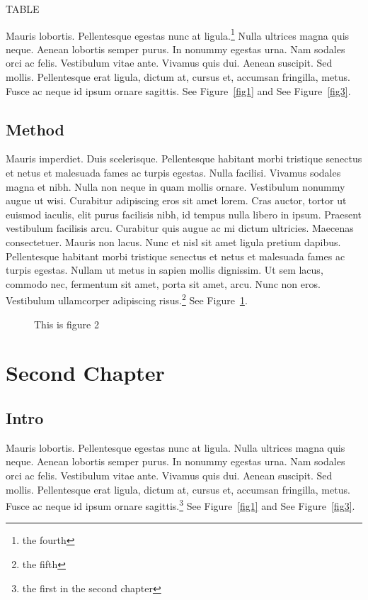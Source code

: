\documentclass{report}
\begin{document}
\begin{table}[ht]
\centering
{\Large TABLE}
\end{table}

Mauris lobortis. Pellentesque egestas nunc at ligula.\footnote{the fourth} Nulla ultrices magna quis
neque. Aenean lobortis semper purus. In nonummy egestas urna. Nam sodales orci
ac felis. Vestibulum vitae ante. Vivamus quis dui. Aenean suscipit. Sed mollis.
Pellentesque erat ligula, dictum at, cursus et, accumsan fringilla, metus. Fusce
ac neque id ipsum ornare sagittis.  See Figure~\ref{fig1} and See Figure~\ref{fig3}.

\section{Method}
Mauris imperdiet. Duis scelerisque. Pellentesque habitant morbi tristique
senectus et netus et malesuada fames ac turpis egestas. Nulla facilisi. Vivamus
sodales magna et nibh. Nulla non neque in quam mollis ornare. Vestibulum nonummy
augue ut wisi. Curabitur adipiscing eros sit amet lorem. Cras auctor, tortor ut
euismod iaculis, elit purus facilisis nibh, id tempus nulla libero in ipsum.
Praesent vestibulum facilisis arcu. Curabitur quis augue ac mi dictum ultricies.
Maecenas consectetuer. Mauris non lacus. Nunc et nisl sit amet ligula pretium
dapibus. Pellentesque habitant morbi tristique senectus et netus et malesuada
fames ac turpis egestas. Nullam ut metus in sapien mollis dignissim. Ut sem
lacus, commodo nec, fermentum sit amet, porta sit amet, arcu. Nunc non eros.
Vestibulum ullamcorper adipiscing risus.\footnote{the fifth}  See Figure~\ref{fig2}.

\begin{figure}[h]
\begin{center}
\vspace{2cm}
\label{fig2}
\caption{This is figure 2}
\end{center}
\end{figure}

\chapter{Second Chapter}

\section{Intro}
Mauris lobortis. Pellentesque egestas nunc at ligula. Nulla ultrices magna quis
neque. Aenean lobortis semper purus. In nonummy egestas urna. Nam sodales orci
ac felis. Vestibulum vitae ante. Vivamus quis dui. Aenean suscipit. Sed mollis.
Pellentesque erat ligula, dictum at, cursus et, accumsan fringilla, metus. Fusce
ac neque id ipsum ornare sagittis.\footnote{the first in the second chapter}  See Figure~\ref{fig1} and See Figure~\ref{fig3}.
\end{document}
